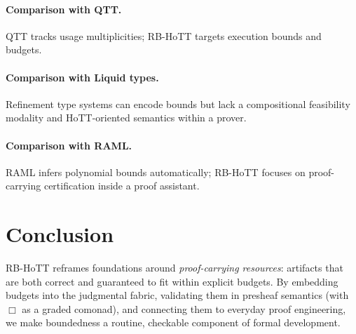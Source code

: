 \documentclass[11pt]{article}
\begin{document}
\paragraph{Comparison with QTT.} QTT tracks usage multiplicities; RB-HoTT targets execution bounds and budgets.
\paragraph{Comparison with Liquid types.} Refinement type systems can encode bounds but lack a compositional feasibility modality and HoTT-oriented semantics within a prover.
\paragraph{Comparison with RAML.} RAML infers polynomial bounds automatically; RB-HoTT focuses on proof-carrying certification inside a proof assistant.

\section{Conclusion}
RB-HoTT reframes foundations around \emph{proof-carrying resources}: artifacts that are both correct and guaranteed to fit within explicit budgets. By embedding budgets into the judgmental fabric, validating them in presheaf semantics (with $\Box$ as a graded comonad), and connecting them to everyday proof engineering, we make boundedness a routine, checkable component of formal development.
\end{document}
